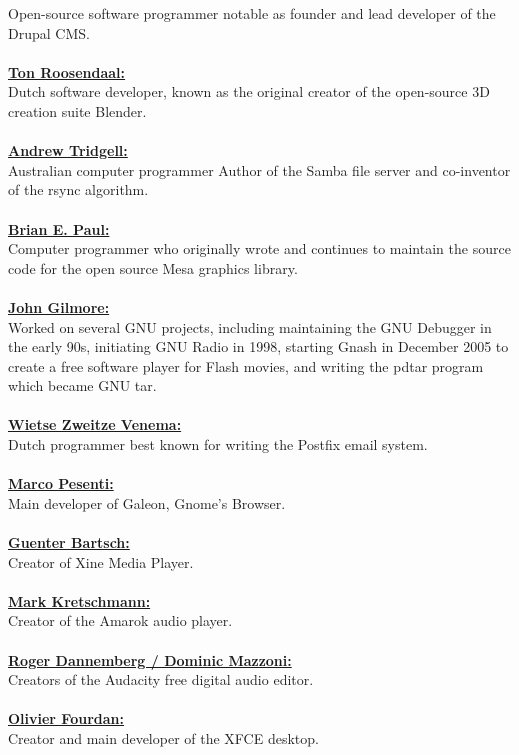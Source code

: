 \documentclass[10pt, a4paper, oneside]{report}
\begin{document}
Open-source software programmer notable as founder and lead developer of the Drupal CMS.\\
\\
\textbf{\underline{Ton Roosendaal:}}\\
Dutch software developer, known as the original creator of the open-source 3D creation suite Blender.\\
\\
\textbf{\underline{Andrew Tridgell:}}\\
Australian computer programmer Author of the Samba file server and co-inventor of the rsync algorithm.\\
\\
\textbf{\underline{Brian E. Paul:}}\\
Computer programmer who originally wrote and continues to maintain the source code for the open source Mesa graphics library.\\
\\
\textbf{\underline{John Gilmore:}}\\
Worked on several GNU projects, including maintaining the GNU Debugger in the early 90s, initiating GNU Radio in 1998, starting Gnash in December 2005 to create a free software player for Flash movies, and writing the pdtar program which became GNU tar.\\
\\
\textbf{\underline{Wietse Zweitze Venema:}}\\
Dutch programmer best known for writing the Postfix email system.\\
\\
\textbf{\underline{Marco Pesenti:}}\\
Main developer of Galeon, Gnome's Browser.\\
\\
\textbf{\underline{Guenter Bartsch:}}\\
Creator of Xine Media Player.\\
\\
\textbf{\underline{Mark Kretschmann:}}\\
Creator of the Amarok audio player.\\
\\
\textbf{\underline{Roger Dannemberg / Dominic Mazzoni:}}\\
Creators of the Audacity free digital audio editor.\\
\\
\textbf{\underline{Olivier Fourdan:}}\\
Creator and main developer of the XFCE desktop.\\
\end{document}
